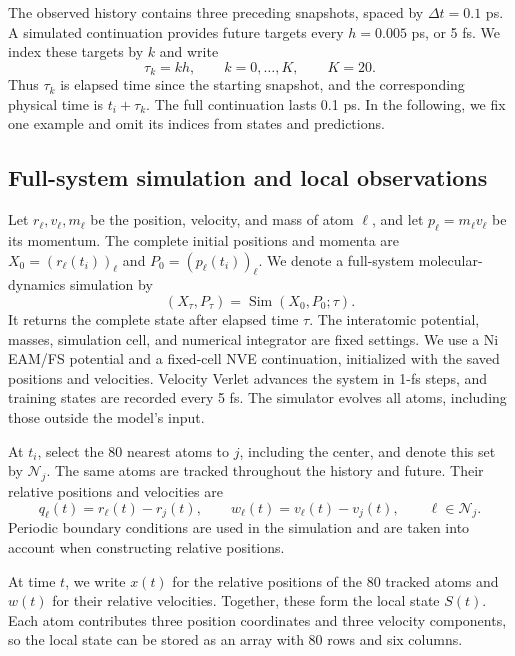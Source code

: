 \documentclass[11pt,a4paper]{article}
\numberwithin{equation}{section}
\newcommand{\Sim}{\operatorname{Sim}}
\begin{document}
The observed history contains three preceding snapshots, spaced by
$\Delta t=0.1$ ps. A simulated continuation provides future targets every
$h=0.005$ ps, or 5 fs. We index these targets by $k$ and write
\begin{equation}
\tau_k=kh,\qquad k=0,\ldots,K,\qquad K=20.
\label{eq:time}
\end{equation}
Thus $\tau_k$ is elapsed time since the starting snapshot, and the corresponding
physical time is $t_i+\tau_k$. The full continuation lasts 0.1 ps. In the
following, we fix one example and omit its indices from states and predictions.

\subsection{Full-system simulation and local observations}

Let $r_\ell,v_\ell,m_\ell$ be the position, velocity, and mass of atom $\ell$,
and let $p_\ell=m_\ell v_\ell$ be its momentum. The complete initial positions
and momenta are $X_0=(r_\ell(t_i))_\ell$ and $P_0=(p_\ell(t_i))_\ell$.
We denote a full-system molecular-dynamics simulation by
\begin{equation}
\boxed{(X_\tau,P_\tau)=\Sim(X_0,P_0;\tau).}
\label{eq:sim}
\end{equation}
It returns the complete state after elapsed time $\tau$. The interatomic
potential, masses, simulation cell, and numerical integrator are fixed
settings. We use a Ni EAM/FS potential and a fixed-cell NVE continuation,
initialized with the saved positions and velocities. Velocity Verlet advances
the system in 1-fs steps, and training states are recorded every 5 fs.
The simulator evolves all atoms, including those outside the model's input.

At $t_i$, select the 80 nearest atoms to $j$, including the center, and denote
this set by $\mathcal N_j$. The same atoms are tracked throughout the history
and future. Their relative positions and velocities are
\begin{equation}
q_\ell(t)=r_\ell(t)-r_j(t),\qquad
w_\ell(t)=v_\ell(t)-v_j(t),\qquad \ell\in\mathcal N_j.
\end{equation}
Periodic boundary conditions are used in the simulation and are taken into
account when constructing relative positions.

At time $t$, we write $x(t)$ for the relative positions of the 80 tracked atoms
and $w(t)$ for their relative velocities. Together, these form the local state
$S(t)$. Each atom contributes three position coordinates and three velocity
components, so the local state can be stored as an array with 80 rows and six
columns.
\end{document}
